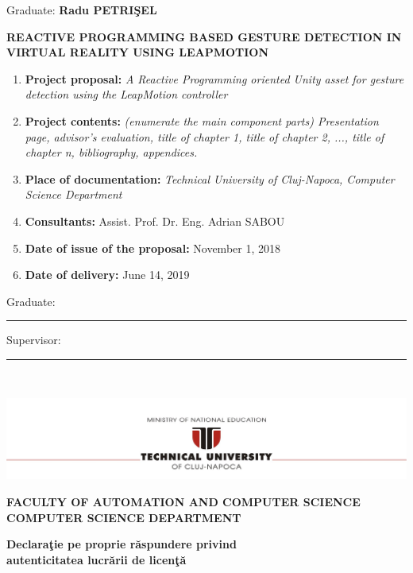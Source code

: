 \documentclass[12pt,a4paper,twoside]{report}
\renewcommand{\thesisauthor}{Radu PETRIŞEL}    %
\renewcommand{\thesistitle}{REACTIVE PROGRAMMING BASED GESTURE DETECTION IN VIRTUAL REALITY USING LEAPMOTION}
\renewcommand{\thesissupervisor}{Assist. Prof. Dr. Eng. Adrian SABOU}
\newcommand{\department}{\bf FACULTY OF AUTOMATION AND COMPUTER SCIENCE\\
COMPUTER SCIENCE DEPARTMENT}
\newcommand{\utcnlogo}{\includegraphics[width=15cm]{img/tucn.jpg}}
\newcommand{\uline}[1]{\rule[0pt]{#1}{0.4pt}}
\begin{document}
\begin{center}
Graduate: {\bf \thesisauthor}

\vspace{1cm}

{\bf \thesistitle}
\end{center}

\vspace{1cm}

\begin{enumerate}
  \item {\bf Project proposal:} {\it A Reactive Programming oriented Unity asset for gesture detection using the LeapMotion controller}
  \item {\bf Project contents:} {\it (enumerate the main component parts) Presentation page, advisor's evaluation, title of chapter 1, title of chapter 2, ..., title of chapter n, bibliography, appendices.}
  \item {\bf Place of documentation:} {\it Technical University of Cluj-Napoca, Computer Science Department}
  \item {\bf Consultants:} \thesissupervisor{}
  \item {\bf Date of issue of the proposal:} November 1, 2018
  \item {\bf Date of  delivery:} June 14, 2019
\end{enumerate}

\vspace{1.2cm}

\hspace{6cm} Graduate: \uline{6cm} 

\vspace{0.5cm}
\hspace{6cm} Supervisor: \uline{6cm} 

\thispagestyle{empty}


\newpage
$ $


\thispagestyle{empty}
\newpage

\begin{center}
\utcnlogo

\department
\end{center}

\vspace{0.5cm}

\begin{center}
{\bf
Declara\c{t}ie pe proprie r\u{a}spundere privind\\ 
autenticitatea lucr\u{a}rii de licen\c{t}\u{a}}
\end{center}
\vspace{1cm}
\end{document}
